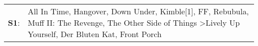 \begin{supertabular}{p{0.03\textwidth}p{0.92\textwidth}}
 \textbf{S1}:  &  All In Time\textsuperscript{}, \enspace Hangover\textsuperscript{}, \enspace Down Under\textsuperscript{}, \enspace Kimble[1]\textsuperscript{}, \enspace FF\textsuperscript{}, \enspace Rebubula\textsuperscript{}, \enspace Muff II: The Revenge\textsuperscript{}, \enspace The Other Side of Things\textsuperscript{} \textgreater \enspace Lively Up Yourself\textsuperscript{}, \enspace Der Bluten Kat\textsuperscript{}, \enspace Front Porch\textsuperscript{}  \enspace  \\
\end{supertabular}
